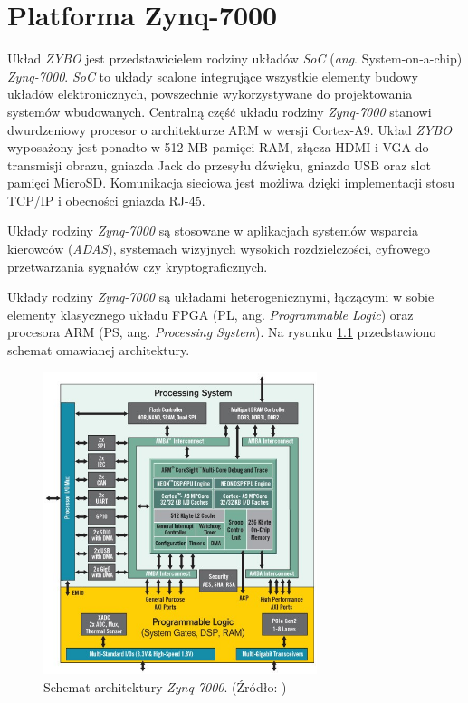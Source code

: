 \chapter{Platforma Zynq-7000}
\label{platforma}

Układ \emph{ZYBO} jest przedstawicielem rodziny układów \emph{SoC} (\emph{ang}. System-on-a-chip) \emph{Zynq-7000}. \emph{SoC} to układy scalone integrujące wszystkie elementy budowy układów elektronicznych, powszechnie wykorzystywane do projektowania systemów wbudowanych. Centralną część układu rodziny \emph{Zynq-7000} stanowi dwurdzeniowy procesor o architekturze ARM w wersji Cortex-A9. \cite{zynq-homepage} Układ \emph{ZYBO} wyposażony jest ponadto w 512 MB pamięci RAM, złącza HDMI i VGA do transmisji obrazu, gniazda Jack do przesyłu dźwięku, gniazdo USB oraz slot pamięci MicroSD. Komunikacja sieciowa jest możliwa dzięki implementacji stosu TCP/IP i obecności gniazda RJ-45. \cite{zynq-datasheet}

Układy rodziny \emph{Zynq-7000} są stosowane w aplikacjach systemów wsparcia kierowców (\emph{ADAS}), systemach wizyjnych wysokich rozdzielczości, cyfrowego przetwarzania sygnałów czy kryptograficznych. \cite{GuanwenZhong,MaleenAbeydeera,PawelDabal2014}

Układy rodziny \emph{Zynq-7000} są układami heterogenicznymi, łączącymi w sobie elementy klasycznego układu FPGA (PL, ang. \emph{Programmable Logic}) oraz procesora ARM (PS, ang. \emph{Processing System}). Na rysunku \ref{fig:zynq-overview} przedstawiono schemat omawianej architektury.

\begin{figure}[h]
	\centering
	\includegraphics[width=8cm]{img/zyng-platform.png}
	\caption{Schemat architektury \emph{Zynq-7000}. (Źródło: \cite{zybo-reference-manual})}
	\label{fig:zynq-overview}
\end{figure}

